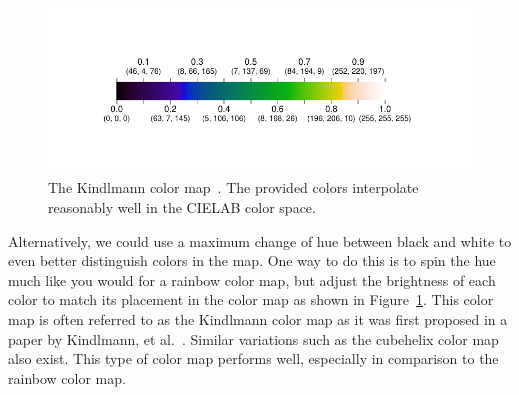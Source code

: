 \documentclass[letterpaper,twocolumn,fleqn]{article}
\newcommand*{\lcite}[1]{~\cite{#1}}
\newcommand*{\scite}[1]{~\cite{#1}}
\newcommand{\etal}{et al.\xspace}
\begin{document}
\begin{figure}[htb]
  \centering
  \includegraphics[width=\linewidth,trim=0.69in 0.62in 0.76in 0.62in]
                  {ipython/KindlmannMap}
  \caption{The Kindlmann color map\lcite{Kindlmann2002}. The provided
    colors interpolate reasonably well in the CIELAB color space.}
  \label{fig:KindlmannColorBar}
\end{figure}

Alternatively, we could use a maximum change of hue between black and white
to even better distinguish colors in the map. One way to do this is to spin
the hue much like you would for a rainbow color map, but adjust the
brightness of each color to match its placement in the color map as shown
in Figure~\ref{fig:KindlmannColorBar}. This color map is often referred to
as the Kindlmann color map as it was first proposed in a paper by
Kindlmann, \etal\scite{Kindlmann2002}. Similar variations such as the
cubehelix color map\lcite{Green2011} also exist. This type of color map
performs well, especially in comparison to the rainbow color map.
\end{document}
